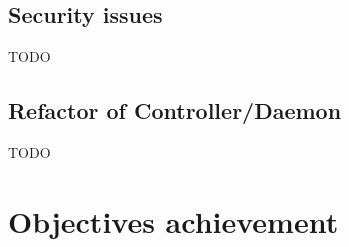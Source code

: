 \documentclass{eplmastersthesis}
\begin{document}
      \subsection{Security issues}
      {\color{red} TODO}

      \subsection{Refactor of Controller/Daemon}
      {\color{red} TODO}

    \section{Objectives achievement}

  \nocite{*}
  
  

  \backcoverpage
\end{document}
